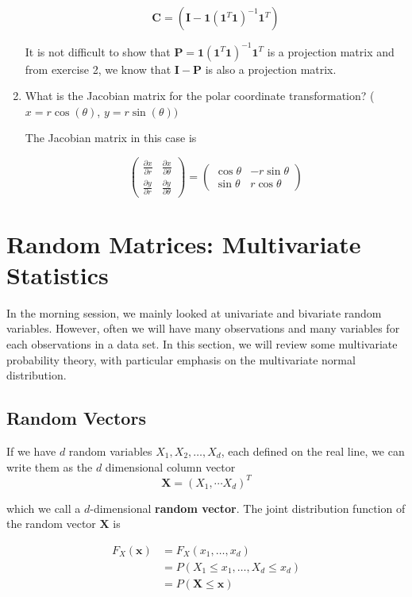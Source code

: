 \documentclass[11pt]{article}
\theoremstyle{definition}
\begin{document}
\begin{enumerate}
$$\mathbf{C} = (\mathbf{I} - \mathbf{1}(\mathbf{1}^T \mathbf{1})^{-1} \mathbf{1}^T)$$

It is not difficult to show that $\mathbf{P} = \mathbf{1}(\mathbf{1}^T \mathbf{1})^{-1} \mathbf{1}^T$ is a projection matrix and from exercise 2, we know that $\mathbf{I} - \mathbf{P}$ is also a projection matrix.

\item What is the Jacobian matrix for the polar coordinate transformation? ($x = r \cos (\theta)$, $y = r \sin (\theta))$

The Jacobian matrix in this case is

$$\begin{pmatrix} \frac{\partial x}{\partial r} & \frac{\partial x}{\partial \theta} \\ \frac{\partial y}{\partial r} & \frac{\partial y}{\partial \theta}\end{pmatrix} = \begin{pmatrix} \cos \theta & -r \sin \theta \\ \sin \theta & r \cos \theta \end{pmatrix}$$


\end{enumerate}

\section{Random Matrices: Multivariate Statistics}
In the morning session, we mainly looked at univariate and bivariate random variables.  However, often we will have many observations and many variables for each observations in a data set.  In this section, we will review some multivariate probability theory, with particular emphasis on the multivariate normal distribution.

\subsection{Random Vectors}
If we have $d$ random variables $X_1, X_2, \hdots, X_d$, each defined on the real line, we can write them as the $d$ dimensional column vector $$\mathbf{X} = (X_1, \cdots X_d)^T$$

which we call a $d$-dimensional \textbf{random vector}.  The joint distribution function of the random vector $\mathbf{X}$ is

\begin{align*}
F_X(\mathbf{x}) &= F_X(x_1, \hdots, x_d) \\
&= P(X_1 \leq x_1, \hdots, X_d \leq x_d)\\
&= P(\mathbf{X} \leq \mathbf{x})
\end{align*}
\end{document}

